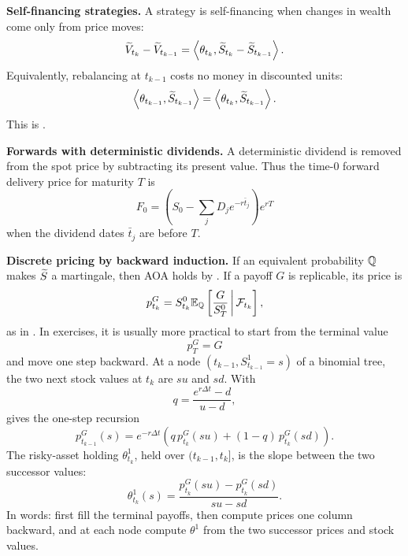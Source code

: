 \begin{techniques}
  \item \textbf{Self-financing strategies.}  A strategy is self-financing
  when changes in wealth come only from price moves:
  \[
    \widetilde V_{t_k}-\widetilde V_{t_{k-1}}
      =\left\langle \theta_{t_k},\widetilde S_{t_k}-\widetilde S_{t_{k-1}}\right\rangle.
  \]
  Equivalently, rebalancing at \(t_{k-1}\) costs no money in discounted
  units:
  \[
    \left\langle \theta_{t_{k-1}},\widetilde S_{t_{k-1}}\right\rangle
      =\left\langle \theta_{t_k},\widetilde S_{t_{k-1}}\right\rangle.
  \]
  This is .

  \item \textbf{Forwards with deterministic dividends.}  A deterministic
  dividend is removed from the spot price by subtracting its present value.
  Thus the time-0 forward delivery price for maturity \(T\) is
  \[
    F_0=\left(S_0-\sum_j D_j e^{-r\bar t_j}\right)e^{rT}
  \]
  when the dividend dates \(\bar t_j\) are before \(T\).

  \item \textbf{Discrete pricing by backward induction.}  If an equivalent
  probability \(\mathbb{Q}\) makes \(\widetilde S\) a martingale, then AOA holds by
  .  If a payoff \(G\) is replicable, its price is
  \[
    p^G_{t_k}
      =S^0_{t_k}\mathbb{E}_{\mathbb{Q}}\left[\frac{G}{S^0_T}\,\middle|\,\mathcal{F}_{t_k}\right],
  \]
  as in .  In exercises, it is usually more practical to
  start from the terminal value
  \[
    p^G_T=G
  \]
  and move one step backward.  At a node
  \((t_{k-1},S^1_{t_{k-1}}=s)\) of a binomial tree, the two next stock values
  at \(t_k\) are \(su\) and \(sd\).  With
  \[
    q=\frac{e^{r\Delta t}-d}{u-d},
  \]
   gives the one-step recursion
  \[
    p^G_{t_{k-1}}(s)
      =e^{-r\Delta t}\left(
        q\,p^G_{t_k}(su)
        +(1-q)\,p^G_{t_k}(sd)
      \right).
  \]
  The risky-asset holding \(\theta^1_{t_k}\), held over
  \((t_{k-1},t_k]\), is the slope between the two successor values:
  \[
    \theta^1_{t_k}(s)
      =
      \frac{p^G_{t_k}(su)-p^G_{t_k}(sd)}
           {su-sd}.
  \]
  In words: first fill the terminal payoffs, then compute prices one column
  backward, and at each node compute \(\theta^1\) from the two successor
  prices and stock values.
\end{techniques}
